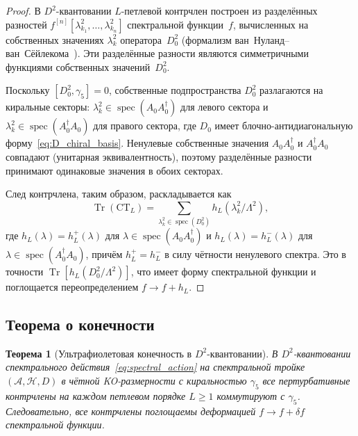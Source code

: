 \documentclass[12pt,a4paper]{article}
\newtheorem{theorem}{Теорема}[section]
\theoremstyle{definition}
\theoremstyle{remark}
\newcommand{\Tr}{\operatorname{Tr}}
\newcommand{\Lam}{\Lambda}
\newcommand{\Hilb}{\mathcal{H}}
\newcommand{\Alg}{\mathcal{A}}
\begin{document}
\begin{proof}
В $D^2$-квантовании $L$-петлевой контрчлен построен из разделённых
разностей $f^{[n]}[\lambda_{k_1}^2, \ldots, \lambda_{k_n}^2]$
спектральной функции~$f$, вычисленных на собственных значениях
$\lambda_k^2$ оператора~$D_0^2$ (формализм
ван~Нуланд--ван~Сёйлекома~\cite{vanNuland:2021oneloop}).  Эти
разделённые разности являются симметричными функциями собственных
значений~$D_0^2$.

Поскольку $[D_0^2, \gamma_5] = 0$, собственные подпространства $D_0^2$
разлагаются на киральные секторы: $\lambda_k^2 \in
\operatorname{spec}(A_0 A_0^\dagger)$ для левого сектора и
$\lambda_k^2 \in \operatorname{spec}(A_0^\dagger A_0)$ для правого
сектора, где $D_0$ имеет блочно-антидиагональную
форму~\eqref{eq:D_chiral_basis}.  Ненулевые собственные значения
$A_0 A_0^\dagger$ и $A_0^\dagger A_0$ совпадают (унитарная
эквивалентность), поэтому разделённые разности принимают одинаковые
значения в обоих секторах.

След контрчлена, таким образом, раскладывается как
\begin{equation}
  \Tr(\mathrm{CT}_L) = \sum_{\lambda_k^2 \in \operatorname{spec}(D_0^2)}
  h_L(\lambda_k^2/\Lam^2),
\end{equation}
где $h_L(\lambda) = h_L^+(\lambda)$ для $\lambda \in
\operatorname{spec}(A_0 A_0^\dagger)$ и $h_L(\lambda) = h_L^-(\lambda)$
для $\lambda \in \operatorname{spec}(A_0^\dagger A_0)$, причём
$h_L^+ = h_L^-$ в силу чётности ненулевого спектра.  Это в точности
$\Tr[h_L(D_0^2/\Lam^2)]$, что имеет форму спектральной функции и
поглощается переопределением $f \to f + h_L$.
\end{proof}

\subsection{Теорема о конечности}

\begin{theorem}[Ультрафиолетовая конечность в $D^2$-квантовании]\label{thm:finiteness}
В $D^2$-квантовании спектрального действия~\eqref{eq:spectral_action}
на спектральной тройке $(\Alg, \Hilb, D)$ в чётной KO-размерности с
киральностью $\gamma_5$ все пертурбативные контрчлены на каждом петлевом
порядке $L \geq 1$ коммутируют с $\gamma_5$.  Следовательно, все
контрчлены поглощаемы деформацией $f \to f + \delta f$ спектральной
функции.
\end{theorem}
\end{document}
